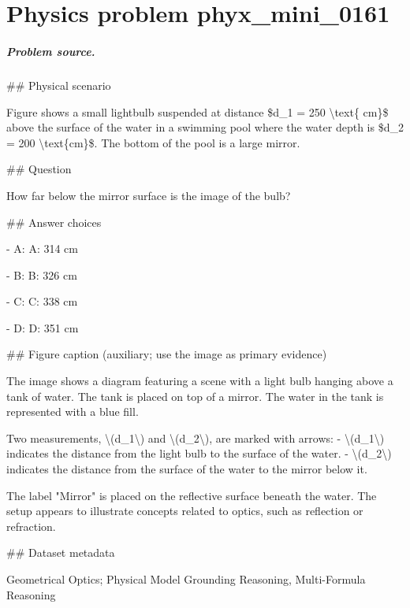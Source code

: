 
\chapter{Physics problem phyx\_mini\_0161}
\label{ch:PhyXMiniProblems_problem_phyx_mini_0161}

\paragraph{Problem source.}
\#\# Physical scenario

Figure shows a small lightbulb suspended at distance \$d\_1 = 250 \textbackslash{}text\{ cm\}\$ above the surface of the water in a swimming pool where the water depth is \$d\_2 = 200 \textbackslash{}text\{cm\}\$. The bottom of the pool is a large mirror.

\#\# Question

How far below the mirror surface is the image of the bulb?

\#\# Answer choices

- A: A: 314 cm

- B: B: 326 cm

- C: C: 338 cm

- D: D: 351 cm

\#\# Figure caption (auxiliary; use the image as primary evidence)

The image shows a diagram featuring a scene with a light bulb hanging above a tank of water. The tank is placed on top of a mirror. The water in the tank is represented with a blue fill. 

Two measurements, \textbackslash{}(d\_1\textbackslash{}) and \textbackslash{}(d\_2\textbackslash{}), are marked with arrows:
- \textbackslash{}(d\_1\textbackslash{}) indicates the distance from the light bulb to the surface of the water.
- \textbackslash{}(d\_2\textbackslash{}) indicates the distance from the surface of the water to the mirror below it.

The label "Mirror" is placed on the reflective surface beneath the water. The setup appears to illustrate concepts related to optics, such as reflection or refraction.

\#\# Dataset metadata

Geometrical Optics; Physical Model Grounding Reasoning, Multi-Formula Reasoning

